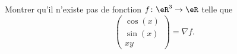 
\begin{exercice}\label{exoOutilsMath-0037}

    Montrer qu'il n'existe pas de fonction $f\colon \eR^3\to \eR$ telle que
    \begin{equation}
        \begin{pmatrix}
            \cos(x)    \\ 
            \sin(x)    \\ 
            xy    
        \end{pmatrix}=\nabla f.
    \end{equation}

\end{exercice}

